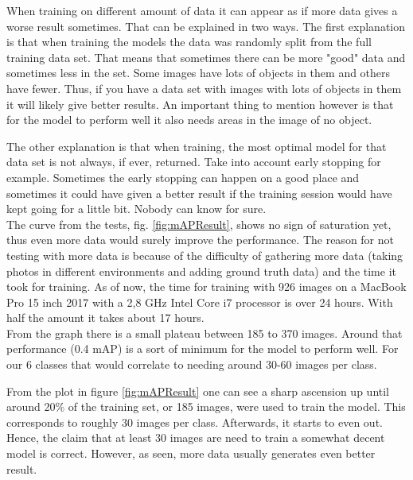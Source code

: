 When training on different amount of data it can appear as if more data gives a worse
result sometimes. That can be explained in two ways. The first explanation is that when
training the models the data was randomly split from the full training data set. That 
means that sometimes there can be more "good" data and sometimes less in the set.
Some images have lots of objects in them and others have fewer. Thus, if you have a
data set with images with lots of objects in them it will likely give better results.
An important thing to mention however is that for the model to perform well it also needs
areas in the image of no object.

The other explanation is that when training, the most optimal model for that data set is
not always, if ever, returned. Take into account early stopping for example.
Sometimes the early stopping can happen on a good place and sometimes it could have
given a better result if the training session would have kept going for a little bit.
Nobody can know for sure. \\

The curve from the tests, fig. \ref{fig:mAPResult}, shows no sign of saturation yet, thus even more data would
surely improve the performance. The reason for not testing with more data is because
of the difficulty of gathering more data (taking photos in different environments and 
adding ground truth data) and the time it took for training.
As of now, the time for training with 926 images on a MacBook Pro 15 inch 2017 with a 2,8 GHz
Intel Core i7 processor is over 24 hours. With half the amount it takes about 17 hours.\\

From the graph there is a small plateau between 185 to 370 images. Around that
performance (0.4 mAP) is a sort of minimum for the model to perform well.
For our 6 classes that would correlate to needing around 30-60 images per class.

From the plot in figure \ref{fig:mAPResult} one can see a sharp ascension up until around  20\% of the training set, or 185 images, were used to train the model. This corresponds to roughly 30 images per class. Afterwards, it starts to even out. Hence, the claim that at least 30 images are need to train a somewhat decent model is correct. However, as seen, more data usually generates even better result.

\newpage